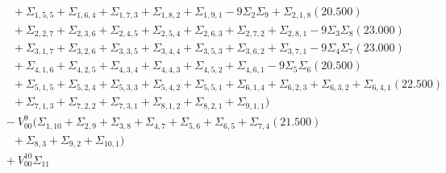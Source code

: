 \documentclass[12pt]{article}
\begin{document}
\begin{landscape}
\begin{align*}
		&\quad\quad +\Sigma_{1,5,5}+\Sigma_{1,6,4}+\Sigma_{1,7,3}+\Sigma_{1,8,2}+\Sigma_{1,9,1}-9\Sigma_{2}\Sigma_{9}+\Sigma_{2,1,8}(20.500) \\ 
		&\quad\quad +\Sigma_{2,2,7}+\Sigma_{2,3,6}+\Sigma_{2,4,5}+\Sigma_{2,5,4}+\Sigma_{2,6,3}+\Sigma_{2,7,2}+\Sigma_{2,8,1}-9\Sigma_{3}\Sigma_{8}(23.000) \\ 
		&\quad\quad +\Sigma_{3,1,7}+\Sigma_{3,2,6}+\Sigma_{3,3,5}+\Sigma_{3,4,4}+\Sigma_{3,5,3}+\Sigma_{3,6,2}+\Sigma_{3,7,1}-9\Sigma_{4}\Sigma_{7}(23.000) \\ 
		&\quad\quad +\Sigma_{4,1,6}+\Sigma_{4,2,5}+\Sigma_{4,3,4}+\Sigma_{4,4,3}+\Sigma_{4,5,2}+\Sigma_{4,6,1}-9\Sigma_{5}\Sigma_{6}(20.500) \\ 
		&\quad\quad +\Sigma_{5,1,5}+\Sigma_{5,2,4}+\Sigma_{5,3,3}+\Sigma_{5,4,2}+\Sigma_{5,5,1}+\Sigma_{6,1,4}+\Sigma_{6,2,3}+\Sigma_{6,3,2}+\Sigma_{6,4,1}(22.500) \\ 
		&\quad\quad +\Sigma_{7,1,3}+\Sigma_{7,2,2}+\Sigma_{7,3,1}+\Sigma_{8,1,2}+\Sigma_{8,2,1}+\Sigma_{9,1,1}) \\
		&\quad\; -V_{00}^{9}(\Sigma_{1,10}+\Sigma_{2,9}+\Sigma_{3,8}+\Sigma_{4,7}+\Sigma_{5,6}+\Sigma_{6,5}+\Sigma_{7,4}(21.500) \\ 
		&\quad\quad +\Sigma_{8,3}+\Sigma_{9,2}+\Sigma_{10,1}) \\
		&\quad\; +V_{00}^{10}\Sigma_{11} \\
\end{align*}
\end{landscape}
\end{document}
